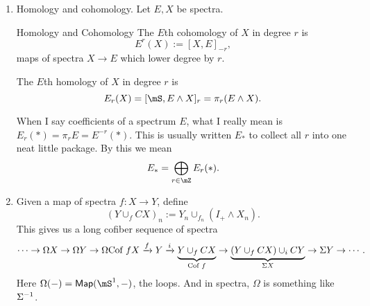 \begin{enumerate}
    Consider the map $f:\mS\to \mS$ which is a degree 2 map, so we have maps $S^{n+2}\to S^n$. Note that $S^2\to S^0$ is nullhomotopic. $S^3\to S^1$ is nullhomotopic. However, $S^4\to S^2$ is not nullhomotopic and can be represented by $\eta^2$ (look up the Hopf map! There are several cool links if you ask one of us about them). 

    Here is yet another construction!
    \begin{definition}{Maps between spectra, version 3}{}
        A map of spectra $f:E\to F$ of degree $r$ is a homotopy class of functions of spectra $f:E\to F$ of degree $r$ where the function is defined ``in the limit.'' Find the maps between high enough $E_N$, and worry about the early ones later on. Scotty heard from his advisor that this philosophy is ``cells now, maps later.''
    \end{definition}
     When we talk about maps from spectra to spectra of degree $r$, we denote the collection of homotopy classes of maps of degree $r$ between the two spectra as $$[E,F]_r.$$
    \item Homology and cohomology. Let $E,X$ be spectra. 
    
    \begin{definition}{Homology and Cohomology}{}
        The $E$th cohomology of $X$ in degree $r$ is $$E^r(X):=[X,E]_{-r},$$ maps of spectra $X\to E$ which lower degree by $r$. 
    
        The $E$th homology of $X$ in degree $r$ is $$E_r(X)=[\mS,E\wedge X]_r = \pi_r(E\wedge X).$$
    \end{definition}
    When I say coefficients of a spectrum $E$, what I really mean is $E_r(\ast) = \pi_r E = E^{-r}(\ast)$. This is usually written $E_\ast$ to collect all $r$ into one neat little package. By this we mean $$E_\ast = \bigoplus_{r\in \mZ} E_r(\ast).$$
    \item Given a map of spectra $f:X\to Y$, define $$(Y\cup_f CX)_n:=Y_n\cup_{f_n}(I_+\wedge X_n).$$ This gives us a long cofiber sequence of spectra $$\cdots\to\Omega X\to \Omega Y\to\Omega \text{Cof } fX\xrightarrow{f}Y\xrightarrow{i}\underbrace{Y\cup_f CX}_{\text{Cof }f}\to \underbrace{(Y\cup_f CX)\cup_i CY}_{\Sigma X}\to \Sigma Y\to \cdots.$$ Here $\Omega(-) = \mathsf{Map}(\mS^1,-)$, the loops. And in spectra, $\Omega$ is something like $\Sigma^{-1}$. 
\end{enumerate}

